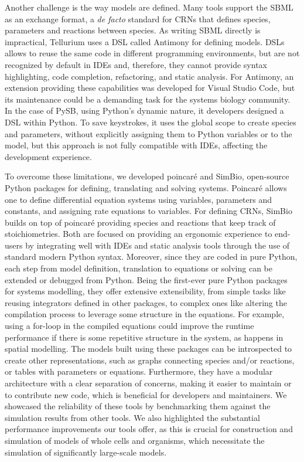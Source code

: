 \documentclass[namedate,numsec,webpdf,modern,large]{oup-authoring-template}
\theoremstyle{thmstyleone}%
\theoremstyle{thmstyletwo}%
\theoremstyle{thmstylethree}%
\begin{document}
Another challenge is the way models are defined.
Many tools support the \ac{SBML} \citep{huckaSBMLL3V2} as an exchange format,
a \emph{de facto} standard for \acp{CRN} that defines species, parameters and reactions between species.
As writing \ac{SBML} directly is impractical,
Tellurium uses a \ac{DSL} called Antimony \citep{smithAntimonyModularModel2009} for defining models.
\Acp{DSL} allows to reuse the same code in different programming environments,
but are not recognized by default in \acp{IDE}
and, therefore, they cannot provide syntax highlighting, code completion, refactoring, and static analysis.
For Antimony, an extension providing these capabilities was developed for Visual Studio Code,
but its maintenance could be a demanding task for the systems biology community.
In the case of PySB,
using Python's dynamic nature,
it developers designed a \ac{DSL} within Python.
To save keystrokes,
it uses the global scope to create species and parameters,
without explicitly assigning them to Python variables or to the model,
but this approach is not fully compatible with \acp{IDE},
affecting the development experience.

To overcome these limitations,
we developed poincaré and SimBio,
open-source Python packages for defining, translating and solving systems.
Poincaré allows one to define differential equation systems
using variables, parameters and constants,
and assigning rate equations to variables.
For defining \acp{CRN},
SimBio builds on top of poincaré providing species and reactions that keep track of stoichiometries.
Both are focused on providing an ergonomic experience to end-users
by integrating well with \acp{IDE} and static analysis tools
through the use of standard modern Python syntax.
Moreover, since they are coded in pure Python,
each step from model definition, translation to equations or solving
can be extended or debugged from Python.
Being the first-ever pure Python packages for systems modelling,
they offer extensive extensibility,
from simple tasks like reusing integrators defined in other packages,
to complex ones like altering the compilation process to leverage some structure in the equations.
For example, using a for-loop in the compiled equations could improve the runtime performance
if there is some repetitive structure in the system,
as happens in spatial modelling.
The models built using these packages can be introspected to create other representations,
such as graphs connecting species and/or reactions, or tables with parameters or equations.
Furthermore, they have a modular architecture with a clear separation of concerns,
making it easier to maintain or to contribute new code,
which is beneficial for developers and maintainers.
We showcased the reliability of these tools by benchmarking them against the simulation results from other tools.
We also highlighted the substantial performance improvements our tools offer,
as this is crucial for construction and simulation of models of whole cells and organisms,
which necessitate the simulation of significantly large-scale models.
\end{document}
